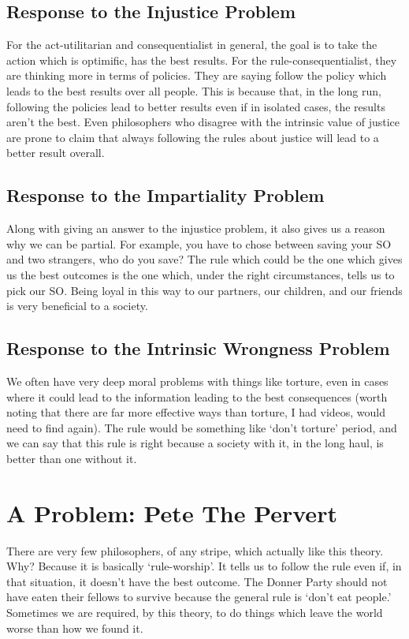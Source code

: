 \subsection{Response to the Injustice Problem}

For the act-utilitarian and consequentialist in general, the goal is to take the action which is optimific, has the best results. For the rule-consequentialist, they are thinking more in terms of policies. They are saying follow the policy which leads to the best results over all people. This is because that, in the long run, following the policies lead to better results even if in isolated cases, the results aren’t the best. Even philosophers who disagree with the intrinsic value of justice are prone to claim that always following the rules about justice will lead to a better result overall.

\subsection{Response to the Impartiality Problem}

Along with giving an answer to the injustice problem, it also gives us a reason why we can be partial. For example, you have to chose between saving your SO and two strangers, who do you save? The rule which could be the one which gives us the best outcomes is the one which, under the right circumstances, tells us to pick our SO. Being loyal in this way to our partners, our children, and our friends is very beneficial to a society.

\subsection{Response to the Intrinsic Wrongness Problem}

We often have very deep moral problems with things like torture, even in cases where it could lead to the information leading to the best consequences (worth noting that there are far more effective ways than torture, I had videos, would need to find again). The rule would be something like ‘don’t torture’ period, and we can say that this rule is right because a society with it, in the long haul, is better than one without it.

\section{A Problem: Pete The Pervert}

There are very few philosophers, of any stripe, which actually like this theory. Why? Because it is basically ‘rule-worship’. It tells us to follow the rule even if, in that situation, it doesn’t have the best outcome. The Donner Party should not have eaten their fellows to survive because the general rule is ‘don’t eat people.’ Sometimes we are required, by this theory, to do things which leave the world worse than how we found it.

